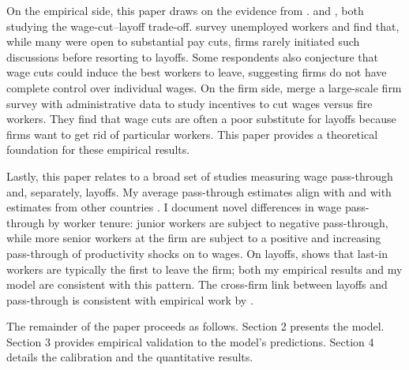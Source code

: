 On the empirical side, this paper draws on the evidence from \textcite{bewley1999}. \textcite{bertheau2025} and \textcite{davis2025}, both studying the wage-cut–layoff trade-off. \textcite{davis2025} survey unemployed workers and find that, while many were open to substantial pay cuts, firms rarely initiated such discussions before resorting to layoffs. Some respondents also conjecture that wage cuts could induce the best workers to leave, suggesting firms do not have complete control over individual wages. On the firm side, \textcite{bertheau2025} merge a large-scale firm survey with administrative data to study incentives to cut wages versus fire workers. They find that wage cuts are often a poor substitute for layoffs because firms want to get rid of particular workers. This paper provides a theoretical foundation for these empirical results.

Lastly, this paper relates to a broad set of studies measuring wage pass-through and, separately, layoffs. My average pass-through estimates align with \textcite{souchier2022} and with estimates from other countries \parencite{guvenen2017,guiso2020}. I document novel differences in wage pass-through by worker tenure: junior workers are subject to negative pass-through, while more senior workers at the firm are subject to a positive and increasing pass-through of productivity shocks on to wages.
On layoffs, \textcite{buhai2014} shows that last-in workers are typically the first to leave the firm; both my empirical results and my model are consistent with this pattern. The cross-firm link between layoffs and pass-through is consistent with empirical work by \textcite{dias2013,enrlich2024}.

The remainder of the paper proceeds as follows. Section 2 presents the model. Section 3 provides empirical validation to the model's predictions. Section 4 details the calibration and the quantitative results.
